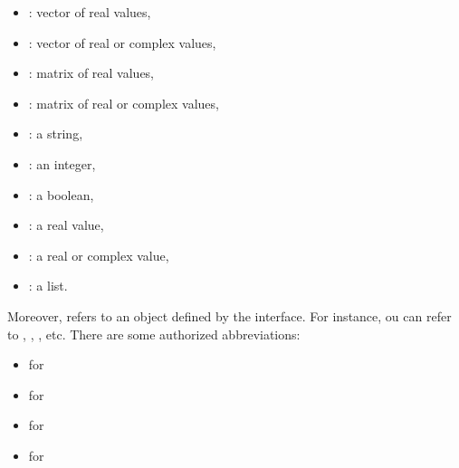 \documentclass[a4paper,11pt,english]{sphinxmanual}
\begin{document}
\begin{itemize}
\begin{itemize}
\item {} 
   : vector of real values,

\item {} 
    : vector of real or complex values,

\item {} 
   : matrix of real values,

\item {} 
    : matrix of real or complex values,

\item {} 
    : a string,

\item {} 
    : an integer,

\item {} 
   : a boolean,

\item {} 
   : a real value,

\item {} 
 : a real or complex value,

\item {} 
   : a list.

\end{itemize}

Moreover,  refers to an object defined by the interface.
For instance, ou can refer to , , , etc.
There are some authorized abbreviations:
\begin{itemize}
\item {} 
  for  

\item {} 
  for  

\item {} 
  for  

\item {} 
  for  


\end{itemize}
\end{itemize}
\end{document}
